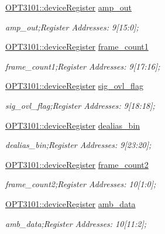 \begin{DoxyCompactItemize}
\mbox{\hyperlink{class_o_p_t3101_1_1device_register}{O\+P\+T3101\+::device\+Register}} \mbox{\hyperlink{class_o_p_t3101_1_1registers_a09663efd977de72bdf7820e0a8f92390}{amp\+\_\+out}}
\begin{DoxyCompactList}\small\item\em amp\+\_\+out;Register Addresses\+: 9\mbox{[}15\+:0\mbox{]}; \end{DoxyCompactList}\item 
\mbox{\hyperlink{class_o_p_t3101_1_1device_register}{O\+P\+T3101\+::device\+Register}} \mbox{\hyperlink{class_o_p_t3101_1_1registers_a736858f4b79f2dd5444fc1938148d438}{frame\+\_\+count1}}
\begin{DoxyCompactList}\small\item\em frame\+\_\+count1;Register Addresses\+: 9\mbox{[}17\+:16\mbox{]}; \end{DoxyCompactList}\item 
\mbox{\hyperlink{class_o_p_t3101_1_1device_register}{O\+P\+T3101\+::device\+Register}} \mbox{\hyperlink{class_o_p_t3101_1_1registers_ad767a496a0cad5741d575a54a095add3}{sig\+\_\+ovl\+\_\+flag}}
\begin{DoxyCompactList}\small\item\em sig\+\_\+ovl\+\_\+flag;Register Addresses\+: 9\mbox{[}18\+:18\mbox{]}; \end{DoxyCompactList}\item 
\mbox{\hyperlink{class_o_p_t3101_1_1device_register}{O\+P\+T3101\+::device\+Register}} \mbox{\hyperlink{class_o_p_t3101_1_1registers_a1faab11698859e9d42e148c1d8cd5d1e}{dealias\+\_\+bin}}
\begin{DoxyCompactList}\small\item\em dealias\+\_\+bin;Register Addresses\+: 9\mbox{[}23\+:20\mbox{]}; \end{DoxyCompactList}\item 
\mbox{\hyperlink{class_o_p_t3101_1_1device_register}{O\+P\+T3101\+::device\+Register}} \mbox{\hyperlink{class_o_p_t3101_1_1registers_a1247368fca5573a9ab4b69d541c53a57}{frame\+\_\+count2}}
\begin{DoxyCompactList}\small\item\em frame\+\_\+count2;Register Addresses\+: 10\mbox{[}1\+:0\mbox{]}; \end{DoxyCompactList}\item 
\mbox{\hyperlink{class_o_p_t3101_1_1device_register}{O\+P\+T3101\+::device\+Register}} \mbox{\hyperlink{class_o_p_t3101_1_1registers_ae6b7c86e96cbfb1efe3263caed9de137}{amb\+\_\+data}}
\begin{DoxyCompactList}\small\item\em amb\+\_\+data;Register Addresses\+: 10\mbox{[}11\+:2\mbox{]}; \end{DoxyCompactList}\item 

\end{DoxyCompactItemize}
